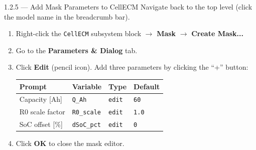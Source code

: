 \documentclass[11pt,a4paper]{article}
\begin{document}
\begin{guistep}{1.2.5 — Add Mask Parameters to CellECM}
Navigate back to the top level (click the model name in the breadcrumb bar).
\begin{enumerate}
    \item Right-click the \texttt{CellECM} subsystem block $\to$ \textbf{Mask} $\to$ \textbf{Create Mask...}
    \item Go to the \textbf{Parameters \& Dialog} tab.
    \item Click \textbf{Edit} (pencil icon). Add three parameters by clicking the ``+'' button:

    \begin{center}
    \begin{tabular}{llll}
        \toprule
        \textbf{Prompt} & \textbf{Variable} & \textbf{Type} & \textbf{Default} \\
        \midrule
        Capacity [Ah]      & \texttt{Q\_Ah}      & \texttt{edit} & \texttt{60} \\
        R0 scale factor     & \texttt{R0\_scale}  & \texttt{edit} & \texttt{1.0} \\
        SoC offset [\%]     & \texttt{dSoC\_pct}  & \texttt{edit} & \texttt{0} \\
        \bottomrule
    \end{tabular}
    \end{center}

    \item Click \textbf{OK} to close the mask editor.
\end{enumerate}
\end{guistep}
\end{document}
